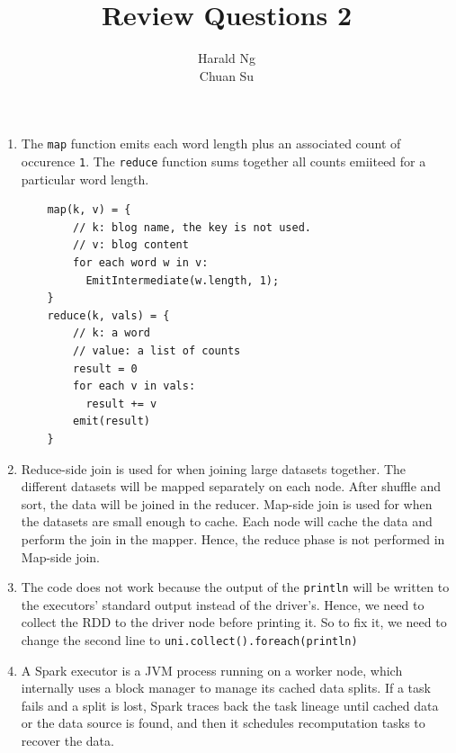 \documentclass[12pt]{article}
\begin{document}
\title{Review Questions 2}
\author{Harald Ng \\
        Chuan Su}

\maketitle
\begin{enumerate}
\item The \texttt{map} function emits each word length plus an associated count of occurence \texttt{1}. The \texttt{reduce} function sums together all counts emiiteed for a particular word length.

\begin{verbatim}
    map(k, v) = {
        // k: blog name, the key is not used.
        // v: blog content
        for each word w in v:
          EmitIntermediate(w.length, 1);
    }
    reduce(k, vals) = {
        // k: a word
        // value: a list of counts
        result = 0
        for each v in vals:
          result += v
        emit(result)
    }
\end{verbatim}

\item Reduce-side join is used for when joining large datasets together. The different datasets will be mapped separately on each node. After shuffle and sort, the data will be joined in the reducer. Map-side join is used for when the datasets are small enough to cache. Each node will cache the data and perform the join in the mapper. Hence, the reduce phase is not performed in Map-side join.

\item The code does not work because the output of the \texttt{println} will be written to the executors' standard output instead of the driver's. Hence, we need to collect the RDD to the driver node before printing it. So to fix it, we need to change the second line to \texttt{uni.collect().foreach(println)}

\item A Spark executor is a JVM process running on a worker node, which internally uses a block manager to manage its cached data splits. If a task fails and a split is lost, Spark traces back the task lineage until cached data or the data source is found, and then it schedules recomputation tasks to recover the data.


\end{enumerate}
\end{document}

